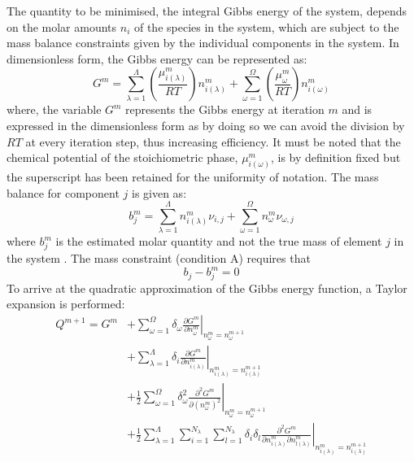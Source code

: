 	The quantity to be minimised,  the integral Gibbs energy of the system, depends on the molar amounts $n_i$ of the species in the system, which are subject to the mass balance constraints given by the individual components in the system. In dimensionless form, the Gibbs energy can be represented as:
	\begin{equation}
		G^m = \sum_{\lambda=1}^{\Lambda} \left(\frac{\mu_{i(\lambda)}^m}{RT}\right)n_{i(\lambda)}^m + \sum_{\omega=1}^{\Omega}\left(\frac{\mu_{\omega}^m}{RT}\right)n_{i(\omega)}^m
	\end{equation}
	where, the variable $G^m$ represents the Gibbs energy at iteration $m$ and is expressed in the dimensionless form as by doing so we can avoid the division by $RT$ at every iteration step, thus increasing efficiency. It must be noted that the chemical potential of the stoichiometric phase, ${\mu_{i(\omega)}^m}$, is by definition fixed but the superscript has been retained for the uniformity of notation.  The mass balance for component $j$ is given as:
	\begin{equation}
		b_j^m = \sum_{\lambda=1}^{\Lambda} n_{i(\lambda)}^m \nu_{i,j} + \sum_{\omega=1}^{\Omega}n_{\omega}^m \nu_{\omega ,j}
	\end{equation}
	where $b_j^m$ is the estimated molar quantity and not the true mass of element $j$ in the system \cite{Piro11b}. The mass constraint (condition A) requires that
	\begin{equation}
		b_j - b_j^m = 0
	\end{equation}
	To arrive at the quadratic approximation of the Gibbs energy function, a Taylor expansion is performed:
	\begin{equation}
		\begin{aligned}
		Q^{m+1} = G^m &+ \left. \sum_{\omega=1}^{\Omega} \delta_{\omega} \frac{\partial G^m}{\partial n_{\omega}^m}\right\vert_{n_{\omega}^m = n_{\omega}^{m+1}} \\
				&+ \left. \sum_{\lambda=1}^{\Lambda} \delta_{i} \frac{\partial G^m}{\partial n_{i(\lambda)}^m}\right\vert_{n_{i(\lambda)}^m = n_{i(\lambda)}^{m+1}} \\
				&+ \frac{1}{2} \left. \sum_{\omega=1}^{\Omega} \delta_{\omega}^2 \frac{\partial^2 G^m}{\partial \left(n_{\omega}^m\right)^2}\right\vert_{n_{\omega}^m = n_{\omega}^{m+1}} \\
				&+ \frac{1}{2} \left. \sum_{\lambda=1}^{\Lambda} \sum_{i=1}^{N_{\lambda}} \sum_{l=1}^{N_{\lambda}} \delta_{i} \delta_{l} \frac{\partial^2 G^m}{\partial n_{i(\lambda)}^{m} \partial n_{l(\lambda)}^{m}} \right\vert_{n_{i(\lambda)}^m = n_{i(\lambda)}^{m+1}}
		\end{aligned}
	\end{equation}
